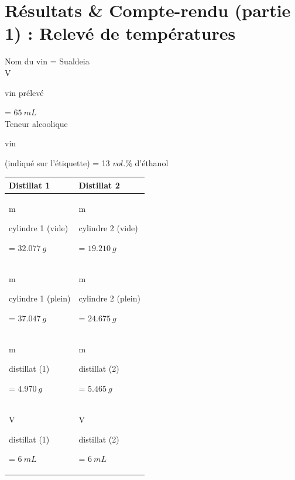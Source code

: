 \documentclass[11pt]{article}
\begin{document}
\section*{Résultats \& Compte-rendu (partie 1) : Relevé de températures}
Nom du vin = Sualdeia \\
V\begin{tiny}vin prélevé\end{tiny} = $65 \: mL$\\
Teneur alcoolique\begin{tiny}vin\end{tiny} (indiqué sur l'étiquette) = 13 $vol. \%$ d'éthanol
\begin{table}[H]
\centering
{}
\begin{tabular}{|l|l|}
\hline
\rowcolor{orange} Distillat 1 & Distillat 2 \\
\hline
m\begin{tiny}cylindre 1 (vide)\end{tiny} = $32.077 \: g$ & m\begin{tiny}cylindre 2 (vide)\end{tiny} = $19.210 \: g$ \\
m\begin{tiny}cylindre 1 (plein)\end{tiny} = $37.047 \: g$ & m\begin{tiny}cylindre 2 (plein)\end{tiny} = $24.675 \: g$ \\
m\begin{tiny}distillat (1)\end{tiny} = $4.970 \: g$ & m\begin{tiny}distillat (2)\end{tiny} = $5.465 \: g$ \\
V\begin{tiny}distillat (1)\end{tiny} = $6 \: mL$ & V\begin{tiny}distillat (2)\end{tiny} = $6 \: mL$ \\
\hline
\end{tabular}
\end{table}
\end{document}
